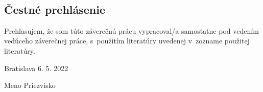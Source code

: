 
\
\vfill

\subsection*{Čestné prehlásenie}

Prehlasujem, že som túto záverečnú prácu vypracoval/a samostatne pod vedením vedúceho záverečnej práce, s~použitím literatúry uvedenej v~zozname použitej literatúry.

\vspace{10pt}

\noindent Bratislava 6. 5. 2022 \hfil
\newline

\begin{flushright}
	Meno Priezvisko $\qquad$
\end{flushright}
